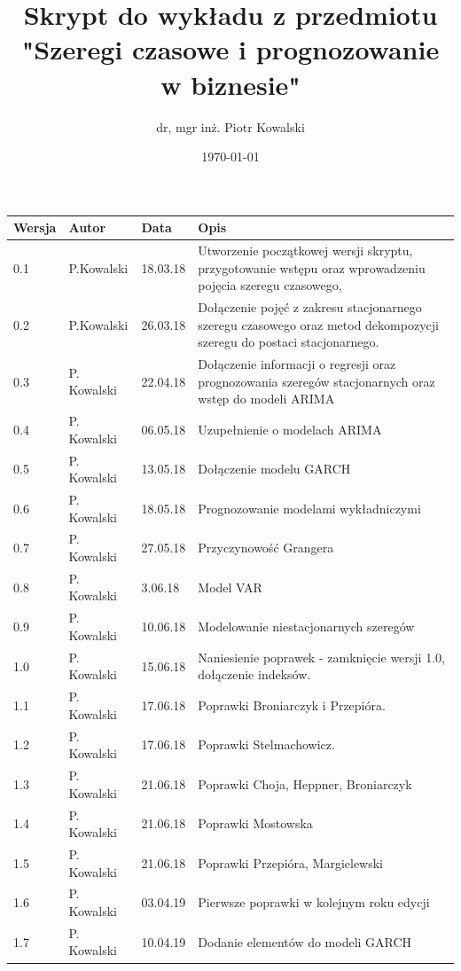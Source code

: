 \documentclass[10pt,a4paper]{book}
\author{dr, mgr inż. Piotr Kowalski}
\title{Skrypt do wykładu z przedmiotu \\"Szeregi czasowe i prognozowanie w biznesie"}
\date{\today}
\begin{document}
\begin{titlepage}
\maketitle
\end{titlepage}
\FloatBarrier

\begin{table}[h]
\centering
\begin{tabular}{|p{1cm}|p{2cm}|p{12mm}|p{12cm}|}\hline
Wersja & Autor & Data & Opis\\\hline
0.1 & P.Kowalski & 18.03.18& Utworzenie początkowej wersji skryptu, przygotowanie wstępu oraz wprowadzeniu pojęcia szeregu czasowego,\\\hline
0.2 & P.Kowalski & 26.03.18& Dołączenie pojęć z zakresu stacjonarnego szeregu czasowego oraz metod dekompozycji szeregu do postaci stacjonarnego.\\\hline
0.3 & P. Kowalski & 22.04.18 & Dołączenie informacji o regresji oraz prognozowania szeregów stacjonarnych oraz wstęp do modeli ARIMA \\\hline
0.4 & P. Kowalski & 06.05.18 & Uzupełnienie o modelach ARIMA \\\hline
0.5 & P. Kowalski & 13.05.18 & Dołączenie modelu GARCH \\\hline
0.6 & P. Kowalski & 18.05.18 & Prognozowanie modelami wykładniczymi \\\hline
0.7 & P. Kowalski & 27.05.18 & Przyczynowość Grangera \\\hline
0.8 & P. Kowalski & 3.06.18 & Model VAR \\\hline
0.9 & P. Kowalski & 10.06.18 & Modelowanie niestacjonarnych szeregów \\\hline
1.0 & P. Kowalski & 15.06.18 & Naniesienie poprawek - zamknięcie wersji 1.0, dołączenie indeksów. \\\hline
1.1 & P. Kowalski & 17.06.18 & Poprawki Broniarczyk i Przepióra. \\\hline
1.2 & P. Kowalski & 17.06.18 & Poprawki Stelmachowicz. \\\hline
1.3 & P. Kowalski & 21.06.18 & Poprawki Choja, Heppner, Broniarczyk  \\\hline
1.4 & P. Kowalski & 21.06.18 & Poprawki Mostowska  \\\hline
1.5 & P. Kowalski & 21.06.18 & Poprawki Przepióra, Margielewski  \\\hline
1.6 & P. Kowalski & 03.04.19 & Pierwsze poprawki w kolejnym roku edycji \\\hline
1.7 & P. Kowalski & 10.04.19 & Dodanie elementów do modeli GARCH \\\hline

\end{tabular}
\end{table}
\end{document}
